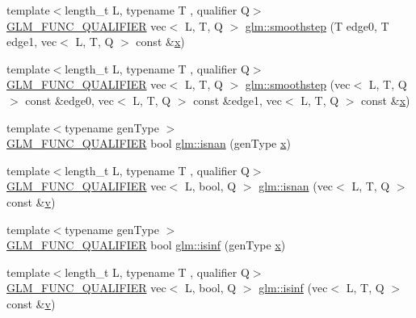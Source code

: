 \begin{DoxyCompactItemize}
{\footnotesize template$<$length\+\_\+t L, typename T , qualifier Q$>$ }\\\hyperlink{setup_8hpp_a33fdea6f91c5f834105f7415e2a64407}{G\+L\+M\+\_\+\+F\+U\+N\+C\+\_\+\+Q\+U\+A\+L\+I\+F\+I\+ER} vec$<$ L, T, Q $>$ \hyperlink{group__core__func__common_gade789a876643ff09880a2714d398b06f}{glm\+::smoothstep} (T edge0, T edge1, vec$<$ L, T, Q $>$ const \&\hyperlink{_s_d_l__opengl_8h_ad0e63d0edcdbd3d79554076bf309fd47}{x})
\item 
{\footnotesize template$<$length\+\_\+t L, typename T , qualifier Q$>$ }\\\hyperlink{setup_8hpp_a33fdea6f91c5f834105f7415e2a64407}{G\+L\+M\+\_\+\+F\+U\+N\+C\+\_\+\+Q\+U\+A\+L\+I\+F\+I\+ER} vec$<$ L, T, Q $>$ \hyperlink{group__core__func__common_ga86a29708af325a4cd7d75cf5bdc8c3f8}{glm\+::smoothstep} (vec$<$ L, T, Q $>$ const \&edge0, vec$<$ L, T, Q $>$ const \&edge1, vec$<$ L, T, Q $>$ const \&\hyperlink{_s_d_l__opengl_8h_ad0e63d0edcdbd3d79554076bf309fd47}{x})
\item 
{\footnotesize template$<$typename gen\+Type $>$ }\\\hyperlink{setup_8hpp_a33fdea6f91c5f834105f7415e2a64407}{G\+L\+M\+\_\+\+F\+U\+N\+C\+\_\+\+Q\+U\+A\+L\+I\+F\+I\+ER} bool \hyperlink{namespaceglm_afd4cba966f582de51d0957ed0abdb244}{glm\+::isnan} (gen\+Type \hyperlink{_s_d_l__opengl_8h_ad0e63d0edcdbd3d79554076bf309fd47}{x})
\item 
{\footnotesize template$<$length\+\_\+t L, typename T , qualifier Q$>$ }\\\hyperlink{setup_8hpp_a33fdea6f91c5f834105f7415e2a64407}{G\+L\+M\+\_\+\+F\+U\+N\+C\+\_\+\+Q\+U\+A\+L\+I\+F\+I\+ER} vec$<$ L, bool, Q $>$ \hyperlink{group__core__func__common_ga29ef934c00306490de837b4746b4e14d}{glm\+::isnan} (vec$<$ L, T, Q $>$ const \&\hyperlink{_s_d_l__opengl_8h_a10a82eabcb59d2fcd74acee063775f90}{v})
\item 
{\footnotesize template$<$typename gen\+Type $>$ }\\\hyperlink{setup_8hpp_a33fdea6f91c5f834105f7415e2a64407}{G\+L\+M\+\_\+\+F\+U\+N\+C\+\_\+\+Q\+U\+A\+L\+I\+F\+I\+ER} bool \hyperlink{namespaceglm_a2c0ee7d7e149b7ddf60abb7b73845330}{glm\+::isinf} (gen\+Type \hyperlink{_s_d_l__opengl_8h_ad0e63d0edcdbd3d79554076bf309fd47}{x})
\item 
{\footnotesize template$<$length\+\_\+t L, typename T , qualifier Q$>$ }\\\hyperlink{setup_8hpp_a33fdea6f91c5f834105f7415e2a64407}{G\+L\+M\+\_\+\+F\+U\+N\+C\+\_\+\+Q\+U\+A\+L\+I\+F\+I\+ER} vec$<$ L, bool, Q $>$ \hyperlink{group__core__func__common_ga2885587c23a106301f20443896365b62}{glm\+::isinf} (vec$<$ L, T, Q $>$ const \&\hyperlink{_s_d_l__opengl_8h_a10a82eabcb59d2fcd74acee063775f90}{v})

\end{DoxyCompactItemize}

